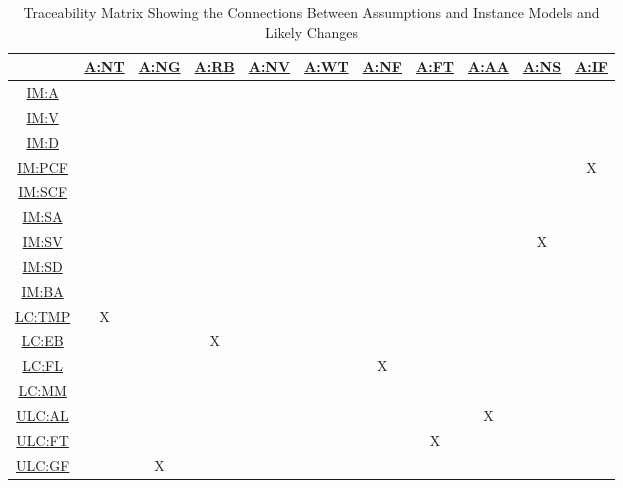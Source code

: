 \documentclass[12pt]{article}
\newcommand{\hpref}[1]{\hyperref[#1]{#1}}
\begin{document}
\begin{table}[H]
\centering
\begin{tabular}{|c|c|c|c|c|c|c|c|c|c|c|}
\hline
	& \hpref{A:NT}& \hpref{A:NG}& \hpref{A:RB}& \hpref{A:NV}& \hpref{A:WT}& \hpref{A:NF}& \hpref{A:FT}& \hpref{A:AA}& \hpref{A:NS}& \hpref{A:IF}\\
\hline
\hpref{IM:A}       & & & & & & & & & & \\ \hline
\hpref{IM:V}       & & & & & & & & & & \\ \hline
\hpref{IM:D}       & & & & & & & & & & \\ \hline
\hpref{IM:PCF}     & & & & & & & & & &X \\ \hline
\hpref{IM:SCF}     & & & & & & & & & & \\ \hline
\hpref{IM:SA}      & & & & & & & & & & \\ \hline
\hpref{IM:SV}      & & & & & & & & &X& \\ \hline
\hpref{IM:SD}      & & & & & & & & & & \\ \hline
\hpref{IM:BA}      & & & & & & & & & & \\ \hline
\hpref{LC:TMP}     &X& & & & & & & & & \\ \hline
\hpref{LC:EB}      & & &X& & & & & & & \\ \hline
\hpref{LC:FL}      & & & & & &X& & & & \\ \hline
\hpref{LC:MM}      & & & & & & & & & & \\ \hline
\hpref{ULC:AL}     & & & & & & & &X& & \\ \hline
\hpref{ULC:FT}     & & & & & & &X& & & \\ \hline
\hpref{ULC:GF}     & &X& & & & & & & & \\ \hline
\end{tabular}
\caption{Traceability Matrix Showing the Connections Between Assumptions and Instance Models and Likely Changes}
\label{Table:trace_Assumptions}
\end{table}
\end{document}
